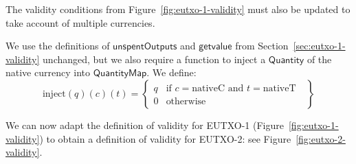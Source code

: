 \documentclass[a4paper]{article}
\newcommand{\s}{\textsf}  %
\newcommand{\getvalue}{\msf{getvalue}}
\newcommand{\msf}[1]{\ensuremath{\mathsf{#1}}}
\newcommand{\unspent}{\msf{unspentOutputs}}
\newcommand{\qty}{\ensuremath{\s{Quantity}}}
\newcommand{\nativeCur}{\ensuremath{\mathrm{nativeC}}}
\newcommand{\nativeTok}{\ensuremath{\mathrm{nativeT}}}
\newcommand{\injectNative}{\ensuremath{\mathrm{inject}}}
\newcommand{\qtymap}{\ensuremath{\s{QuantityMap}}}
\begin{document}
\bigskip
\noindent The validity conditions from
Figure~\ref{fig:eutxo-1-validity} must also be updated to take account
of multiple currencies.

We use the definitions of \unspent{}  and
\getvalue{} from Section~\ref{sec:eutxo-1-validity} unchanged,
but we also require a function to inject a \qty{} of the native currency
into \qtymap{}. We define:
\begin{displaymath}
  \injectNative(q)(c)(t) = \left\{
    \begin{array}{ll}
      q & \mbox{if $c = \nativeCur$ and $t = \nativeTok$ }\\
      0 & \mbox{otherwise}
    \end{array}
  \right\}
\end{displaymath}

We can now adapt the definition of validity for EUTXO-1
(Figure~\ref{fig:eutxo-1-validity}) to obtain a definition of validity for
EUTXO-2: see Figure~\ref{fig:eutxo-2-validity}.
\end{document}
